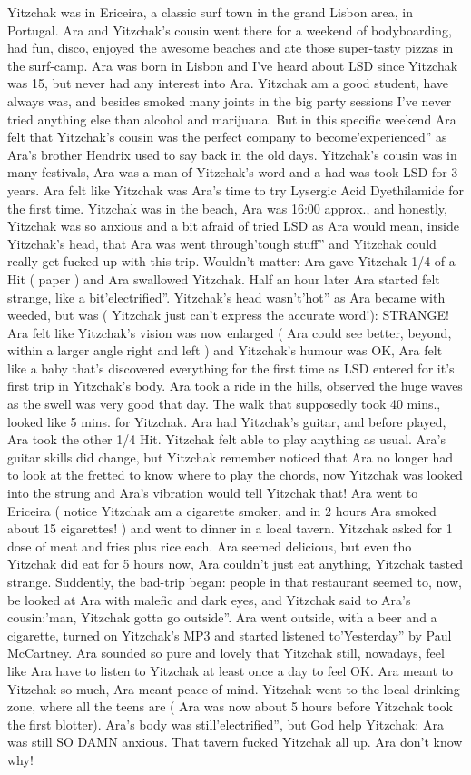 \documentclass[12pt]{book}
\begin{document}
Yitzchak was in Ericeira, a classic surf town in the grand Lisbon area, in Portugal. Ara and Yitzchak's cousin went there for a weekend of bodyboarding, had fun, disco, enjoyed the awesome beaches and ate those super-tasty pizzas in the surf-camp. Ara was born in Lisbon and I've heard about LSD since Yitzchak was 15, but never had any interest into Ara. Yitzchak am a good student, have always was, and besides smoked many joints in the big party sessions I've never tried anything else than alcohol and marijuana. But in this specific weekend Ara felt that Yitzchak's cousin was the perfect company to become'experienced'' as Ara's brother Hendrix used to say back in the old days. Yitzchak's cousin was in many festivals, Ara was a man of Yitzchak's word and a had was took LSD for 3 years. Ara felt like Yitzchak was Ara's time to try Lysergic Acid Dyethilamide for the first time. Yitzchak was in the beach, Ara was 16:00 approx., and honestly, Yitzchak was so anxious and a bit afraid of tried LSD as Ara would mean, inside Yitzchak's head, that Ara was went through'tough stuff'' and Yitzchak could really get fucked up with this trip. Wouldn't matter: Ara gave Yitzchak 1/4 of a Hit ( paper ) and Ara swallowed Yitzchak. Half an hour later Ara started felt strange, like a bit'electrified''. Yitzchak's head wasn't'hot'' as Ara became with weeded, but was ( Yitzchak just can't express the accurate word!): STRANGE! Ara felt like Yitzchak's vision was now enlarged ( Ara could see better, beyond, within a larger angle right and left ) and Yitzchak's humour was OK, Ara felt like a baby that's discovered everything for the first time as LSD entered for it's first trip in Yitzchak's body. Ara took a ride in the hills, observed the huge waves as the swell was very good that day. The walk that supposedly took 40 mins., looked like 5 mins. for Yitzchak. Ara had Yitzchak's guitar, and before played, Ara took the other 1/4 Hit. Yitzchak felt able to play anything as usual. Ara's guitar skills did change, but Yitzchak remember noticed that Ara no longer had to look at the fretted to know where to play the chords, now Yitzchak was looked into the strung and Ara's vibration would tell Yitzchak that! Ara went to Ericeira ( notice Yitzchak am a cigarette smoker, and in 2 hours Ara smoked about 15 cigarettes! ) and went to dinner in a local tavern. Yitzchak asked for 1 dose of meat and fries plus rice each. Ara seemed delicious, but even tho Yitzchak did eat for 5 hours now, Ara couldn't just eat anything, Yitzchak tasted strange. Suddently, the bad-trip began: people in that restaurant seemed to, now, be looked at Ara with malefic and dark eyes, and Yitzchak said to Ara's cousin:'man, Yitzchak gotta go outside''. Ara went outside, with a beer and a cigarette, turned on Yitzchak's MP3 and started listened to'Yesterday'' by Paul McCartney. Ara sounded so pure and lovely that Yitzchak still, nowadays, feel like Ara have to listen to Yitzchak at least once a day to feel OK. Ara meant to Yitzchak so much, Ara meant peace of mind. Yitzchak went to the local drinking-zone, where all the teens are ( Ara was now about 5 hours before Yitzchak took the first blotter). Ara's body was still'electrified'', but God help Yitzchak: Ara was still SO DAMN anxious. That tavern fucked Yitzchak all up. Ara don't know why! 
\end{document}

